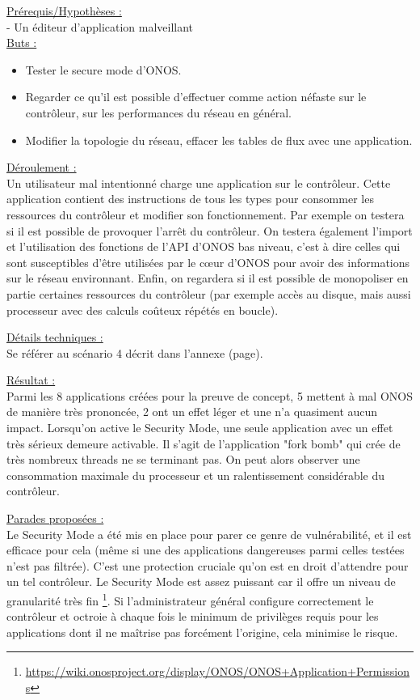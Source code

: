 \underline{Prérequis/Hypothèses :}\\
- Un éditeur d’application malveillant\\


\underline{Buts :}
\begin{itemize}
\item Tester le secure mode d’ONOS.
\item Regarder ce qu’il est possible d’effectuer comme action néfaste sur le contrôleur, sur les performances du réseau en général.
\item Modifier la topologie du réseau, effacer les tables de flux avec une application.\\
\end{itemize}

\underline{Déroulement :}\\
Un utilisateur mal intentionné charge une application sur le contrôleur. Cette application contient des instructions de tous les types pour consommer les ressources du contrôleur et modifier son fonctionnement. Par exemple on testera si il est possible de provoquer l’arrêt du contrôleur. On testera également l’import et l’utilisation des fonctions de l’API d’ONOS bas niveau, c’est à dire celles qui sont susceptibles d’être utilisées par le cœur d’ONOS pour avoir des informations sur le réseau environnant. Enfin, on regardera si il est possible de monopoliser en partie certaines ressources du contrôleur (par exemple accès au disque, mais aussi processeur avec des calculs coûteux répétés en boucle).

\underline{Détails techniques :}\\
Se référer au scénario 4 décrit dans l'annexe (page).

\underline{Résultat :}\\
Parmi les 8 applications créées pour la preuve de concept, 5 mettent à mal ONOS de manière très prononcée, 2 ont un effet léger et une n'a quasiment aucun impact. Lorsqu'on active le Security Mode, une seule application avec un effet très sérieux demeure activable. Il s'agit de l'application "fork bomb" qui crée de très nombreux threads ne se terminant pas. On peut alors observer une consommation maximale du processeur et un ralentissement considérable du contrôleur.

\underline{Parades proposées :}\\
Le Security Mode a été mis en place pour parer ce genre de vulnérabilité, et il est efficace pour cela (même si une des applications dangereuses parmi celles testées n'est pas filtrée). C’est une protection cruciale qu’on est en droit d’attendre pour un tel contrôleur. Le Security Mode est assez puissant car il offre un niveau de granularité très fin \footnote{\url{https://wiki.onosproject.org/display/ONOS/ONOS+Application+Permissions}}. Si l'administrateur général configure correctement le contrôleur et octroie à chaque fois le minimum de privilèges requis pour les applications dont il ne maîtrise pas forcément l'origine, cela minimise le risque.

